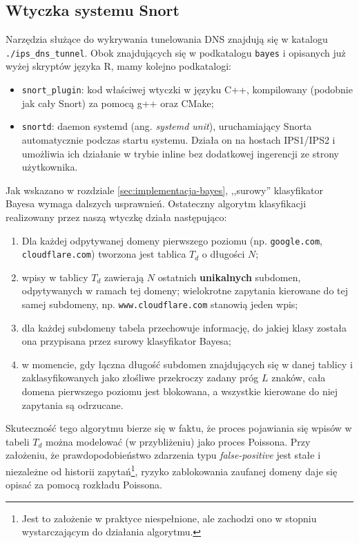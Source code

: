 \documentclass{eiti-raport}
\begin{document}
\subsection{Wtyczka systemu Snort} \label{sec:implementacja-plugin}

Narzędzia służące do wykrywania tunelowania DNS znajdują się w katalogu \texttt{./ips\_dns\_tunnel}. Obok znajdujących się w podkatalogu \texttt{bayes} i opisanych już wyżej skryptów języka R, mamy kolejno podkatalogi:
\begin{itemize}
	\item \texttt{snort\_plugin}: kod właściwej wtyczki w języku C++, kompilowany (podobnie jak cały Snort) za pomocą g++ oraz CMake;
	\item \texttt{snortd}: daemon systemd (ang. \emph{systemd unit}), uruchamiający Snorta automatycznie podczas startu systemu. Działa on na hostach IPS1/IPS2 i umożliwia ich działanie w trybie inline bez dodatkowej ingerencji ze strony użytkownika. 
\end{itemize} 
Jak wskazano w rozdziale \ref{sec:implementacja-bayes}, ,,surowy'' klasyfikator Bayesa wymaga dalszych usprawnień. Ostateczny algorytm klasyfikacji realizowany przez naszą wtyczkę działa następująco:
\begin{enumerate}
	\item Dla każdej odpytywanej domeny pierwszego poziomu (np. \texttt{google.com}, \texttt{cloudflare.com}) tworzona jest tablica $T_d$ o długości $N$;
	\item wpisy w tablicy $T_d$ zawierają $N$ ostatnich \textbf{unikalnych} subdomen, odpytywanych w ramach tej domeny; wielokrotne zapytania kierowane do tej samej subdomeny, np. \texttt{www.cloudflare.com} stanowią jeden wpis;
	\item dla każdej subdomeny tabela przechowuje informację, do jakiej klasy została ona przypisana przez surowy klasyfikator Bayesa;
	\item w momencie, gdy łączna długość subdomen znajdujących się w danej tablicy i zaklasyfikowanych jako złośliwe przekroczy zadany próg $L$ znaków, cała domena pierwszego poziomu jest blokowana, a wszystkie kierowane do niej zapytania są odrzucane.
\end{enumerate}
Skuteczność tego algorytmu bierze się w faktu, że proces pojawiania się wpisów w tabeli $T_d$ można modelować (w przybliżeniu) jako proces Poissona. Przy założeniu, że prawdopodobieństwo zdarzenia typu \emph{false-positive} jest stałe i niezależne od historii zapytań\footnote{Jest to założenie w praktyce niespełnione, ale zachodzi ono w stopniu wystarczającym do działania algorytmu.}, ryzyko zablokowania zaufanej domeny daje się opisać za pomocą rozkładu Poissona.
\end{document}
